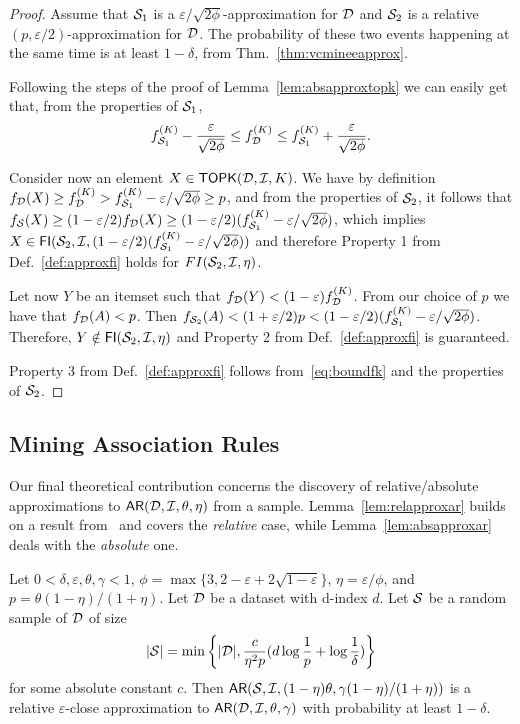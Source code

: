\begin{proof}
  Assume that ${\cal S}_1$ is a $\varepsilon/\sqrt{2\phi}$-approximation for
  ${\cal D}$ and ${\cal S}_2$ is a relative $(p,\varepsilon/2)$-approximation for ${\cal D}$.
  The probability of these two events happening at the same time is at least
  $1-\delta$, from Thm.~\ref{thm:vcmineeapprox}.

  Following the steps of the proof of Lemma~\ref{lem:absapproxtopk} we can
  easily get that, from the properties of ${\cal S}_1$,
  \begin{equation}\label{eq:boundfk}
    f_{{\cal S}_1}^{(K)}-\frac{\varepsilon}{\sqrt{2\phi}}\le f_{\cal D}^{(K)}\le
    f_{{\cal S}_1}^{(K)}+\frac{\varepsilon}{\sqrt{2\phi}}.
  \end{equation}

  Consider now an element $X\in\mathsf{TOPK}({\cal D},{\cal I},K)$. We have by definition
  $f_{\cal D}(X)\ge f_{\cal D}^{(K)} > f_{{\cal S}_1}^{(K)}-\varepsilon/\sqrt{2\phi}\ge
  p$, and from the properties of ${\cal S}_2$, it follows that $f_{\cal S}(X)\ge
  (1-\varepsilon/2)f_{\cal D}(X)\ge(1-\varepsilon/2)(f_{{\cal S}_1}^{(K)}-\varepsilon/\sqrt{2\phi})$,
  which implies
  $X\in\mathsf{FI}({\cal S}_2,{\cal I},(1-\varepsilon/2)(f_{{\cal S}_1}^{(K)}-\varepsilon/\sqrt{2\phi}))$
  and therefore Property 1 from Def.~\ref{def:approxfi} holds for
  $FI({\cal S}_2,{\cal I},\eta)$.
 
  Let now $Y$ be an itemset such that $f_{\cal D}(Y)<(1-\varepsilon)f_{\cal D}^{(K)}$.
  From our choice of $p$ we have that $f_{\cal D}(A)< p$. Then
  $f_{{\cal S}_2}(A)<(1+\varepsilon/2)p<(1-\varepsilon/2)(f_{{\cal S}_1}^{(K)}-\varepsilon/\sqrt{2\phi})$.
  Therefore, $Y\notin\mathsf{FI}({\cal S}_2,{\cal I},\eta)$ and Property 2 from
  Def.~\ref{def:approxfi} is guaranteed.

  Property 3 from Def.~\ref{def:approxfi} follows from~\eqref{eq:boundfk} and
  the properties of ${\cal S}_2$.
\end{proof}

\subsection{Mining Association Rules}\label{sec:miningar}
Our final theoretical contribution concerns the discovery of relative/absolute
approximations to $\mathsf{AR}({\cal D},{\cal I},\theta,\eta)$ from a sample.
Lemma~\ref{lem:relapproxar} builds on a result
from~\cite[Sect.~5]{ChakaravarthyPS09} and covers the \emph{relative} case,
while Lemma~\ref{lem:absapproxar} deals with the \emph{absolute} one.

\begin{lemma}\label{lem:relapproxar}
  Let $0<\delta,\varepsilon,\theta,\gamma<1$,
  $\phi=\max\{3,2-\varepsilon+2\sqrt{1-\varepsilon}\}$,
  $\eta=\varepsilon/\phi$, and $p=\theta(1-\eta)/(1+\eta)$. Let
  ${\cal D}$ be a dataset with d-index $d$.
  Let ${\cal S}$ be a random sample of ${\cal D}$ of size 
  \[
  |{\cal S}|=\min\left\{|{\cal D}|,\frac{c}{\eta^2p}(d\log\frac{1}{p}+\log\frac{1}{\delta})\right\}\]
  for some absolute constant $c$. Then
  $\mathsf{AR}({\cal S},{\cal I},(1-\eta)\theta,\gamma(1-\eta)/(1+\eta))$
  is a relative $\varepsilon$-close approximation to
  $\mathsf{AR}({\cal D},{\cal I},\theta,\gamma)$ with probability at least $1-\delta$.
\end{lemma}

